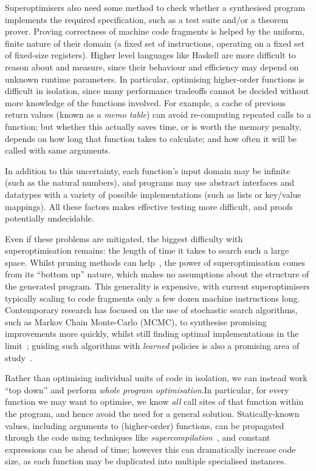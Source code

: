 Superoptimisers also need some method to check whether a synthesised program
implements the required specification, such as a test suite and/or a theorem
prover. Proving correctness of machine code fragments is helped by the uniform,
finite nature of their domain (a fixed set of instructions, operating on a fixed
set of fixed-size registers). Higher level languages like Haskell are more
difficult to reason about and measure, since their behaviour and efficiency may
depend on unknown runtime parameters. In particular, optimising higher-order
functions is difficult in isolation, since many performance tradeoffs cannot be
decided without more knowledge of the functions involved. For example, a cache
of previous return values (known as a \emph{memo table}) can avoid re-computing
repeated calls to a function; but whether this actually saves time, or is worth
the memory penalty, depends on how long that function takes to calculate; and
how often it will be called with same arguments.

In addition to this uncertainty, each function's input domain may be infinite
(such as the natural numbers), and programs may use abstract interfaces and
datatypes with a variety of possible implementations (such as lists or key/value
mappings). All these factors makes effective testing more difficult, and proofs
potentially undecidable.

Even if these problems are mitigated, the biggest difficulty with
superoptimisation remains: the length of time it takes to search such a
large space. Whilst pruning methods can help~\cite{phothilimthana2016scaling},
the power of superoptimisation comes from its ``bottom up'' nature, which makes
no assumptions about the structure of the generated program. This generality is
expensive, with current superoptimisers typically scaling to code fragments only
a few dozen machine instructions long. Contemporary research has focused on the
use of stochastic search algorithms, such as Markov Chain Monte-Carlo (MCMC), to
synthesise promising improvements more quickly, whilst still finding optimal
implementations in the limit~\cite{schkufza2013stochastic}; guiding such
algorithms with \emph{learned} policies is also a promising area of
study~\cite{mudigonda2017learning}.

Rather than optimising individual units of code in isolation, we can instead
work ``top down'' and perform \emph{whole program optimisation}.\iffalse TODO: Cite MLTon, Stalin,
maybe others \fi In particular, for every function we may want to optimise, we
know \emph{all} call sites of that function within the program, and hence avoid
the need for a general solution. Statically-known values, including arguments to
(higher-order) functions, can be propagated through the code using techniques
like \emph{supercompilation}~\cite{Turchin:1986:CS:5956.5957}, and constant
expressions can be ahead of time; however this can dramatically increase code
size, as each function may be duplicated into multiple specialised instances.

